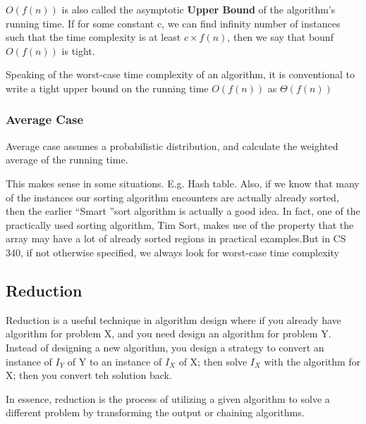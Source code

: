 \documentclass[twoside]{article}
\begin{document}
\(O(f(n))\) is also called the asymptotic \textbf{Upper Bound} of the algorithm's running time. If for some constant c, we can find infinity number of instances such that the time complexity is at least \(c \times f(n) \), then we say that bounf \(O(f(n))\) is tight. 

Speaking of the worst-case time complexity of an algorithm, it is conventional to write a tight upper bound on the running time \(O(f(n))\) as \(\Theta(f(n))\)

\subsubsection{Average Case}
Average case assumes a probabilistic distribution, and calculate the weighted average of the running time.

This makes sense in some situations. E.g. Hash table. Also, if we know that many of the instances our sorting algorithm encounters are actually already sorted, then the earlier “Smart ”sort algorithm is actually a good idea. In fact, one of the practically used sorting algorithm, Tim Sort, makes use of the property that the array may have a lot of already sorted regions in practical examples.But in CS 340, if not otherwise specified, we always look for worst-case time complexity

\subsection{Reduction}
Reduction is a useful technique in algorithm design where if you already have algorithm for problem X, and you need design an algorithm for problem Y. Instead of designing a new algorithm, you design a strategy to convert an instance of \(I_Y\) of Y to an instance of \(I_X\) of X; then solve \(I_X\) with the algorithm for X; then you convert teh solution back. 

In essence, reduction is the process of utilizing a given algorithm to solve a different problem by transforming the output or chaining algorithms. 
\end{document}
